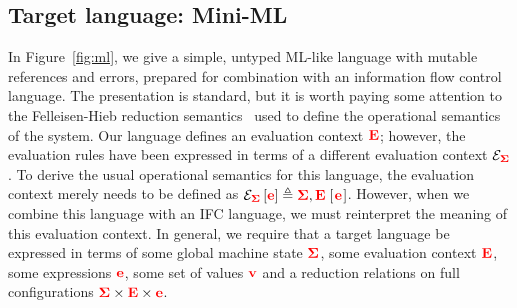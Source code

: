 \documentclass{sigplanconf}
\begin{document}
\subsection{Target language: Mini-ML}

In Figure~\ref{fig:ml}, we give a simple, untyped ML-like language with
mutable references and errors, prepared for combination with an
information flow control language.  The presentation is standard, but it
is worth paying some attention to the Felleisen-Hieb reduction
semantics~\cite{Felleisen:1992:RRS:136293.136297} used to define the
operational semantics of the system.  Our language defines an evaluation
context \ensuremath{\tar{E}}; however, the evaluation rules have been expressed in terms
of a different evaluation context $\mathcal{E}_{\mathbf{\color{red} \Sigma}}$.  To
derive the usual operational semantics for this language, the evaluation
context merely needs to be defined as \ensuremath{\mathcal{E}_{\tar{\Sigma}}\left[\tar{e}\right]\triangleq{}\tar{\Sigma},\tar{E}\;[\mskip1.5mu \tar{e}\mskip1.5mu]}.
However, when we combine this language with an IFC language, we must
reinterpret the meaning of this evaluation context.
In general, we require that a target language be expressed in terms
of some global machine state \ensuremath{\tar{\Sigma}}, some evaluation context \ensuremath{\tar{E}},
some expressions \ensuremath{\tar{e}}, some set of values \ensuremath{\tar{v}} and a reduction
relations on full configurations $\mathbf{\color{red} \Sigma} \times \mathbf{\color{red} E} \times \mathbf{\color{red} e}$.
\end{document}
